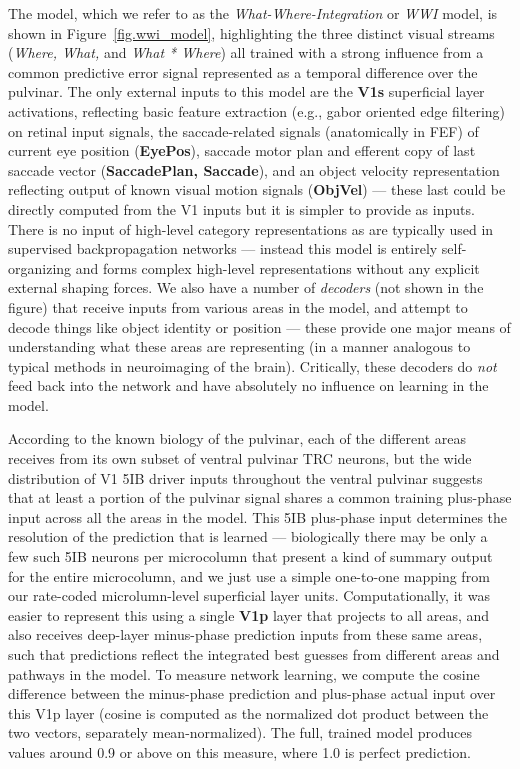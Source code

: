 \documentclass[11pt,twoside]{article}
\newif\myifpdf
\begin{document}

The model, which we refer to as the {\em What-Where-Integration} or {\em WWI} model, is shown in Figure~\ref{fig.wwi_model}, highlighting the three distinct visual streams ({\em Where, What,} and {\em What * Where}) all trained with a strong influence from a common predictive error signal represented as a temporal difference over the pulvinar.  The only external inputs to this model are the {\bf V1s} superficial layer activations, reflecting basic feature extraction (e.g., gabor oriented edge filtering) on retinal input signals, the saccade-related signals (anatomically in FEF) of current eye position ({\bf EyePos}), saccade motor plan and efferent copy of last saccade vector ({\bf SaccadePlan, Saccade}), and an object velocity representation reflecting output of known visual motion signals ({\bf ObjVel}) --- these last could be directly computed from the V1 inputs but it is simpler to provide as inputs.  There is no input of high-level category representations as are typically used in supervised backpropagation networks --- instead this model is entirely self-organizing and forms complex high-level representations without any explicit external shaping forces.  We also have a number of {\em decoders} (not shown in the figure) that receive inputs from various areas in the model, and attempt to decode things like object identity or position --- these provide one major means of understanding what these areas are representing (in a manner analogous to typical methods in neuroimaging of the brain).  Critically, these decoders do {\em not} feed back into the network and have absolutely no influence on learning in the model.

According to the known biology of the pulvinar, each of the different areas receives from its own subset of ventral pulvinar TRC neurons, but the wide distribution of V1 5IB driver inputs throughout the ventral pulvinar \cite{Shipp03} suggests that at least a portion of the pulvinar signal shares a common training plus-phase input across all the areas in the model.  This 5IB plus-phase input determines the resolution of the prediction that is learned --- biologically there may be only a few such 5IB neurons per microcolumn that present a kind of summary output for the entire microcolumn, and we just use a simple one-to-one mapping from our rate-coded microlumn-level superficial layer units.  Computationally, it was easier to represent this using a single {\bf V1p} layer that projects to all areas, and also receives deep-layer minus-phase prediction inputs from these same areas, such that predictions reflect the integrated best guesses from different areas and pathways in the model.  To measure network learning, we compute the cosine difference between the minus-phase prediction and plus-phase actual input over this V1p layer (cosine is computed as the normalized dot product between the two vectors, separately mean-normalized).  The full, trained model produces values around 0.9 or above on this measure, where 1.0 is perfect prediction.
\end{document}
